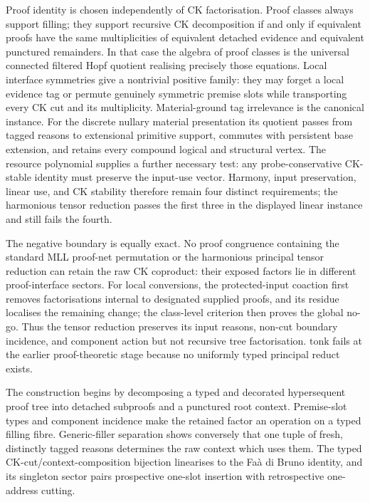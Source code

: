 \documentclass[10pt,a4paper]{article}
\theoremstyle{plain}
\theoremstyle{definition}
\theoremstyle{remark}
\begin{document}
Proof identity is chosen independently of CK factorisation.  Proof classes
always support filling; they support recursive CK decomposition if and
only if equivalent proofs have the same
multiplicities of equivalent detached evidence and equivalent punctured
remainders.  In that case the algebra of proof classes is the universal
connected filtered Hopf quotient realising precisely those equations.  Local
interface symmetries give a nontrivial positive family: they may forget a
local evidence tag or permute genuinely symmetric premise slots while
transporting every CK cut and its multiplicity.  Material-ground tag
irrelevance is the canonical instance.  For the discrete nullary material
presentation its quotient passes from tagged reasons to extensional primitive
support, commutes with persistent base extension, and retains every compound
logical and structural vertex.  The resource polynomial supplies a further
necessary test: any probe-conservative CK-stable identity must preserve the
input-use vector.  Harmony, input preservation, linear use, and CK stability
therefore remain four distinct requirements; the harmonious tensor reduction
passes the first three in the displayed linear instance and still fails the
fourth.

The negative boundary is equally exact.  No proof congruence containing the
standard MLL proof-net permutation or the harmonious principal tensor
reduction can retain the raw CK coproduct: their exposed factors lie in
different proof-interface sectors.  For local conversions, the
protected-input coaction first removes factorisations internal to designated
supplied proofs, and its residue localises the remaining change; the
class-level criterion then proves the global no-go.  Thus the tensor reduction
preserves its input reasons, non-cut boundary incidence, and component action
but not recursive tree factorisation.  \(\mathbin{\mathrm{tonk}}\) fails at
the earlier proof-theoretic stage because no uniformly typed principal reduct
exists.

The construction begins by decomposing a typed and decorated hypersequent
proof tree into detached subproofs and a punctured root context.
Premise-slot types and component incidence make the retained factor an
operation on a typed filling fibre.  Generic-filler separation shows
conversely that one tuple of fresh, distinctly tagged reasons determines the
raw context which uses them.  The typed CK-cut/context-composition bijection
linearises to the Fa\`a di Bruno identity, and its singleton sector pairs
prospective one-slot insertion with retrospective one-address cutting.
\end{document}
